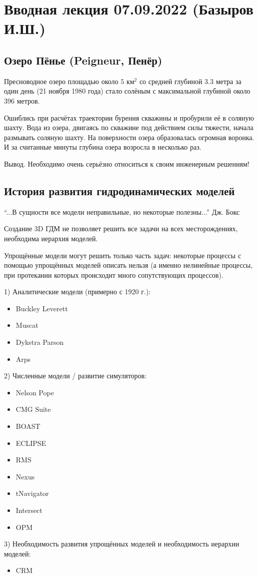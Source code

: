 \documentclass[main.tex]{subfiles}
\begin{document}

\section{Вводная лекция 07.09.2022 (Базыров И.Ш.)}

\subsection{Озеро Пёнье (Peigneur, Пенёр)}

Пресноводное озеро площадью около $5\text{ км}^2$ со средней глубиной $3.3$ метра за один день (21 ноября 1980 года) стало солёным с максимальной глубиной около $396$ метров.

Ошиблись при расчётах траектории бурения скважины и пробурили её в соляную шахту. 
Вода из озера, двигаясь по скважине под действием силы тяжести, начала размывать соляную шахту.
На поверхности озера образовалась огромная воронка. И за считанные минуты глубина озера возросла в несколько раз.

Вывод. Необходимо очень серьёзно относиться к своим инженерным решениям!

\subsection{История развития гидродинамических моделей}

\enquote{...В сущности все модели неправильные, но некоторые полезны...} Дж. Бокс

Создание 3D ГДМ не позволяет решить все задачи на всех месторождениях, необходима иерархия моделей.

Упрощённые модели могут решить только часть задач: некоторые процессы с помощью упрощённых моделей описать нельзя (а именно нелинейные процессы, при протекании которых происходит много сопутствующих процессов).

1) Аналитические модели (примерно с 1920 г.):
\begin{itemize}
	\item Buckley Leverett
	\item Muscat
	\item Dykstra Parson
	\item Arps
\end{itemize}
2) Численные модели / развитие симуляторов:
\begin{itemize}
	\item Nelson Pope
	\item CMG Suite
	\item BOAST
	\item ECLIPSE
	\item RMS
	\item Nexus
	\item tNavigator
	\item Intersect
	\item OPM
\end{itemize}
3) Необходимость развития упрощённых моделей и необходимость иерархии моделей:
\begin{itemize}
	\item CRM
\end{itemize}
\end{document}

